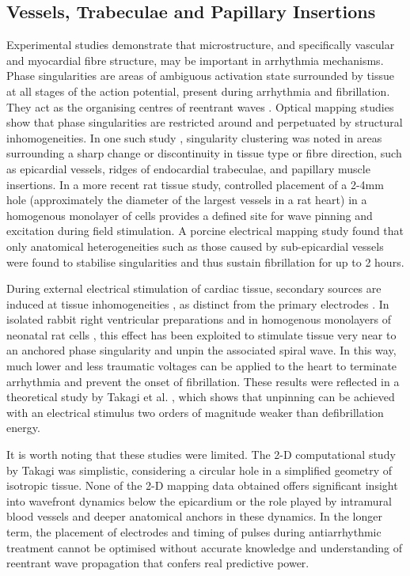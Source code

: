   \subsection{Vessels, Trabeculae and Papillary Insertions} %
  \label{sub:vessels_trabeculae_and_papillary_insertions}
  
    Experimental studies demonstrate that microstructure, and specifically vascular and myocardial fibre structure, may be important in arrhythmia mechanisms. Phase singularities are areas of ambiguous activation state surrounded by tissue at all stages of the action potential, present during arrhythmia and fibrillation. They act as the organising centres of reentrant waves \cite{Gray:1998p391}. Optical mapping studies show that phase singularities are restricted around and perpetuated by structural inhomogeneities. In one such study \cite{Valderrabano:2003p386}, singularity clustering was noted in areas surrounding a sharp change or discontinuity in tissue type or fibre direction, such as epicardial vessels, ridges of endocardial trabeculae, and papillary muscle insertions.      In a more recent rat tissue study\cite{Cysyk:2008p87}, controlled placement of a 2-4mm hole (approximately the diameter of the largest vessels in a rat heart) in a homogenous monolayer of cells provides a defined site for wave pinning and excitation during field stimulation. A porcine electrical mapping study \cite{Qin:2005p665} found that only anatomical heterogeneities such as those caused by sub-epicardial vessels were found to stabilise singularities and thus sustain fibrillation for up to 2 hours.

    During external electrical stimulation of cardiac tissue, secondary sources are induced at tissue inhomogeneities \cite{Sobie:1997p683}, as distinct from the primary electrodes \cite{Roth:1998p684}. In isolated rabbit right ventricular preparations \cite{Ripplinger:2006p681} and in homogenous monolayers of neonatal rat cells \cite{Cysyk:2008p87}, this effect has been exploited to stimulate tissue very near to an anchored phase singularity and unpin the associated spiral wave. In this way, much lower and less traumatic voltages can be applied to the heart to terminate arrhythmia and prevent the onset of fibrillation. These results were reflected in a theoretical study by Takagi et al. \cite{Takagi:2004p96}, which shows that unpinning can be achieved with an electrical stimulus two orders of magnitude weaker than defibrillation energy.
    
    It is worth noting that these studies were limited. The 2-D computational study by Takagi \cite{Takagi:2004p96} was simplistic, considering a circular hole in a simplified geometry of isotropic tissue. None of the 2-D mapping data obtained offers significant insight into wavefront dynamics below the epicardium or the role played by intramural blood vessels and deeper anatomical anchors in these dynamics. In the longer term, the placement of electrodes and timing of pulses during antiarrhythmic treatment cannot be optimised without accurate knowledge and understanding of reentrant wave propagation that confers real predictive power.
    
